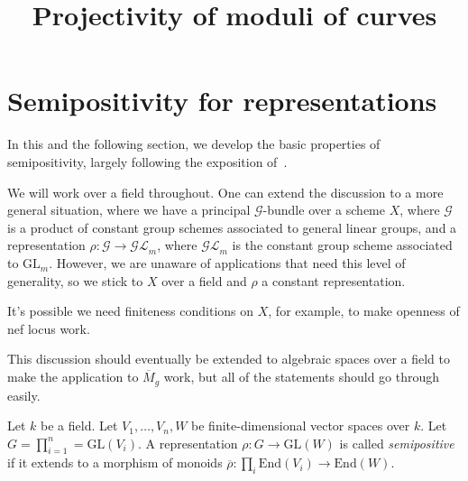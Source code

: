 


\title{Projectivity of moduli of curves}
\maketitle
\tableofcontents

\section{Semipositivity for representations}
In this and the following section, we develop the basic properties
of semipositivity, largely following the exposition of~\cite[Section 3]{ko90}.

\begin{remark}
We will work over a field throughout.
One can extend the discussion to a more general situation, where we have a
principal $\mathcal{G}$-bundle over a scheme $X$, where $\mathcal{G}$ is a
product of constant group schemes associated to general linear groups, and a
representation $\rho:\mathcal{G}\to\mathcal{GL}_m$, where $\mathcal{GL}_m$ is
the constant group scheme associated to $\mathrm{GL}_m$.
However, we are unaware of applications that need this level of generality, so
we stick to $X$ over a field and $\rho$ a constant representation.

It's possible we need finiteness conditions on $X$, for example, to make
openness of nef locus work.
\end{remark}

\begin{remark}
This discussion should eventually be extended to algebraic spaces over a field
to make the application to $\overline{M}_g$ work, but all of the statements
should go through easily.
\end{remark}

\begin{definition}
\label{semipos_rep_def}
Let $k$ be a field.
Let $V_1,\ldots,V_n,W$ be finite-dimensional vector spaces over $k$.
Let $G = \prod_{i=1}^n = \mathrm{GL}(V_i)$.
A representation $\rho:G \to \mathrm{GL}(W)$ is called
\textit{semipositive} if it extends to a morphism of monoids
$\overline{\rho} : \prod_i \mathrm{End}(V_i) \to \mathrm{End}(W)$.
\end{definition}

